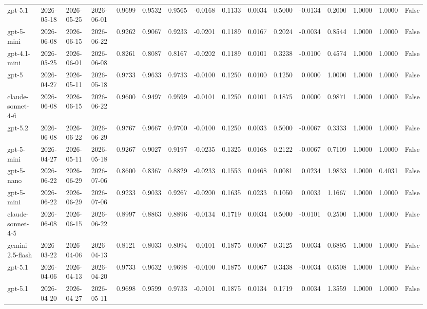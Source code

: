 \begin{table}
\begin{tabular}{llllrrrrrrrrrrrr}
gpt-5.1 & 2026-05-18 & 2026-05-25 & 2026-06-01 & 0.9699 & 0.9532 & 0.9565 & -0.0168 & 0.1133 & 0.0034 & 0.5000 & -0.0134 & 0.2000 & 1.0000 & 1.0000 & False \\
gpt-5-mini & 2026-06-08 & 2026-06-15 & 2026-06-22 & 0.9262 & 0.9067 & 0.9233 & -0.0201 & 0.1189 & 0.0167 & 0.2024 & -0.0034 & 0.8544 & 1.0000 & 1.0000 & False \\
gpt-4.1-mini & 2026-05-25 & 2026-06-01 & 2026-06-08 & 0.8261 & 0.8087 & 0.8167 & -0.0202 & 0.1189 & 0.0101 & 0.3238 & -0.0100 & 0.4574 & 1.0000 & 1.0000 & False \\
gpt-5 & 2026-04-27 & 2026-05-11 & 2026-05-18 & 0.9733 & 0.9633 & 0.9733 & -0.0100 & 0.1250 & 0.0100 & 0.1250 & 0.0000 & 1.0000 & 1.0000 & 1.0000 & False \\
claude-sonnet-4-6 & 2026-06-08 & 2026-06-15 & 2026-06-22 & 0.9600 & 0.9497 & 0.9599 & -0.0101 & 0.1250 & 0.0101 & 0.1875 & 0.0000 & 0.9871 & 1.0000 & 1.0000 & False \\
gpt-5.2 & 2026-06-08 & 2026-06-22 & 2026-06-29 & 0.9767 & 0.9667 & 0.9700 & -0.0100 & 0.1250 & 0.0033 & 0.5000 & -0.0067 & 0.3333 & 1.0000 & 1.0000 & False \\
gpt-5-mini & 2026-04-27 & 2026-05-11 & 2026-05-18 & 0.9267 & 0.9027 & 0.9197 & -0.0235 & 0.1325 & 0.0168 & 0.2122 & -0.0067 & 0.7109 & 1.0000 & 1.0000 & False \\
gpt-5-nano & 2026-06-22 & 2026-06-29 & 2026-07-06 & 0.8600 & 0.8367 & 0.8829 & -0.0233 & 0.1553 & 0.0468 & 0.0081 & 0.0234 & 1.9833 & 1.0000 & 0.4031 & False \\
gpt-5-mini & 2026-06-22 & 2026-06-29 & 2026-07-06 & 0.9233 & 0.9033 & 0.9267 & -0.0200 & 0.1635 & 0.0233 & 0.1050 & 0.0033 & 1.1667 & 1.0000 & 1.0000 & False \\
claude-sonnet-4-5 & 2026-06-08 & 2026-06-15 & 2026-06-22 & 0.8997 & 0.8863 & 0.8896 & -0.0134 & 0.1719 & 0.0034 & 0.5000 & -0.0101 & 0.2500 & 1.0000 & 1.0000 & False \\
gemini-2.5-flash & 2026-03-22 & 2026-04-06 & 2026-04-13 & 0.8121 & 0.8033 & 0.8094 & -0.0101 & 0.1875 & 0.0067 & 0.3125 & -0.0034 & 0.6895 & 1.0000 & 1.0000 & False \\
gpt-5.1 & 2026-04-06 & 2026-04-13 & 2026-04-20 & 0.9733 & 0.9632 & 0.9698 & -0.0100 & 0.1875 & 0.0067 & 0.3438 & -0.0034 & 0.6508 & 1.0000 & 1.0000 & False \\
gpt-5.1 & 2026-04-20 & 2026-04-27 & 2026-05-11 & 0.9698 & 0.9599 & 0.9733 & -0.0101 & 0.1875 & 0.0134 & 0.1719 & 0.0034 & 1.3559 & 1.0000 & 1.0000 & False \\

\end{tabular}
\end{table}
